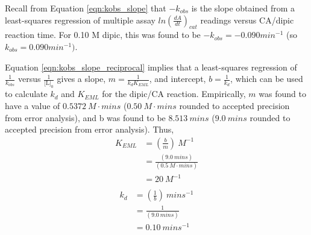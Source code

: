 Recall from Equation \eqref{eqn:kobs_slope} that $-k_{obs}$ is the slope obtained from a least-squares regression of multiple assay $ln \left(\frac{dA}{dt}\right)_{cat}$ readings versus CA/dipic reaction time. For 0.10 M dipic, this was found to be $-k_{obs}=-0.090 min^{-1}$ (so $k_{obs}=0.090 min^{-1})$.

Equation \eqref{eqn:kobs_slope_reciprocal} implies that a least-squares regression of $\frac{1}{k_{obs}}$ versus $\frac{1}{\text{[L]}_0}$ gives a slope, $m=\frac{1}{k_{d}K_{EML}}$, and intercept, $b=\frac{1}{k_{d}}$, which can be used to calculate $k_d$ and $K_{EML}$ for the dipic/CA reaction. Empirically, $m$ was found to have a value of $0.5372\ M\cdot{mins}$ ($0.50\ M\cdot{mins}$ rounded to accepted precision from error analysis), and b was found to be $8.513\ mins$ ($9.0\ mins$ rounded to accepted precision from error analysis). Thus,
\begin{equation}\label{eqn:samp_calc_keml}
\begin{split}
K_{EML}&=\left(\frac{b}{m}\right){\ }M^{-1}\\
&=\frac{\left (9.0{\ }mins\right )}{\left (0.5{\ }M\cdot{mins}\right )}\\
&=20\ M^{-1}\\
\end{split}
\end{equation}
\begin{equation}\label{eqn:samp_calc_kd}
\begin{split}
k_{d}&=\left(\frac{1}{b}\right){\ }mins^{-1}\\
&=\frac{1}{\left (9.0{\ }mins\right )}\\
&=0.10\ mins^{-1}\\
\end{split}
\end{equation}